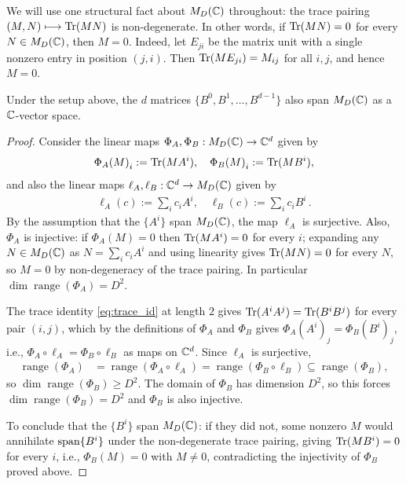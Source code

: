We will use one structural fact about $M_D(\mathbb{C})$ throughout: the trace pairing $(M,N)\longmapsto \operatorname{Tr}(MN)$ is non-degenerate. In other words, if $\operatorname{Tr}(MN)=0$ for every $N\in M_D(\mathbb{C})$, then $M=0$. Indeed, let $E_{ji}$ be the matrix unit with a single nonzero entry in position $(j,i)$. Then $\operatorname{Tr}(ME_{ji})=M_{ij}$ for all $i,j$, and hence $M=0$.


\begin{applem}\label{applem:b_spans}
    Under the setup above, the $d$ matrices $\{B^0, B^1, \ldots, B^{d-1}\}$ also span $M_D(\mathbb{C})$ as a $\mathbb{C}$-vector space.
\end{applem}

\begin{proof}
    Consider the linear maps $\Phi_A, \Phi_B : M_D(\mathbb{C}) \to \mathbb{C}^d$ given by
    \begin{align}
        {\Phi_A(M)}_i := \operatorname{Tr}(M A^i), \quad {\Phi_B(M)}_i := \operatorname{Tr}(M B^i),
    \end{align}
    and also the linear maps $ \ell_A, \ell_B : \mathbb{C}^d \to M_D(\mathbb{C})$ given by
    \begin{align}
        \ell_A(c) := \textstyle\sum_i c_i A^i, \quad \ell_B(c) := \textstyle\sum_i c_i B^i\,.
    \end{align}
    By the assumption that the $\{A^i\}$ span $M_D(\mathbb{C})$, the map $\ell_A$ is surjective. Also, $\Phi_A$ is injective: if $\Phi_A(M) = 0$ then $\operatorname{Tr}(M A^i) = 0$ for every $i$; expanding any $N \in M_D(\mathbb{C})$ as $N = \sum_i c_i A^i$ and using linearity gives $\operatorname{Tr}(M N) = 0$ for every $N$, so $M = 0$ by non-degeneracy of the trace pairing. In particular $\dim \operatorname{range}(\Phi_A) = D^2$.

    The trace identity \cref{eq:trace_id} at length $2$ gives $\operatorname{Tr}(A^i A^j) = \operatorname{Tr}(B^i B^j)$ for every pair $(i, j)$, which by the definitions of $\Phi_A$ and $\Phi_B$ gives ${\Phi_A(A^i)}_j = {\Phi_B(B^i)}_j$, i.e., $\Phi_A \circ \ell_A = \Phi_B \circ \ell_B$ as maps on $\mathbb{C}^d$. Since $\ell_A$ is surjective,
    \[
        \begin{aligned}
            \operatorname{range}(\Phi_A)
             & = \operatorname{range}(\Phi_A \circ \ell_A) = \operatorname{range}(\Phi_B \circ \ell_B) \subseteq \operatorname{range}(\Phi_B),
        \end{aligned}
    \]
    so $\dim \operatorname{range}(\Phi_B) \ge D^2$. The domain of $\Phi_B$ has dimension $D^2$, so this forces $\dim \operatorname{range}(\Phi_B) = D^2$ and $\Phi_B$ is also injective.

    To conclude that the $\{B^i\}$ span $M_D(\mathbb{C})$: if they did not, some nonzero $M$ would annihilate $\operatorname{span}\{B^i\}$ under the non-degenerate trace pairing, giving $\operatorname{Tr}(M B^i) = 0$ for every $i$, i.e., $\Phi_B(M) = 0$ with $M \ne 0$, contradicting the injectivity of $\Phi_B$ proved above.
\end{proof}

